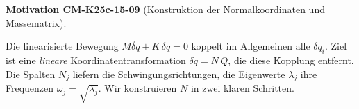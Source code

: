 \documentclass[10pt, letterpaper]{article}
\newcommand{\CustomHeading}[3]{%
  \par\medskip\noindent%
  \textbf{#1 #2} \textnormal{(#3)}.\enskip%
}
\newenvironment{MOT}[2]{\begin{unitbox}\CustomHeading{Motivation}{#1}{#2}}{\end{unitbox}}
\begin{document}

\begin{MOT}{CM-K25c-15-09}{Konstruktion der Normalkoordinaten und Massematrix}
Die linearisierte Bewegung
\(M\ddot{\delta q}+K\,\delta q=0\)
koppelt im Allgemeinen alle $\delta q_i$.
Ziel ist eine \emph{lineare} Koordinaten­transformation
\(\delta q=N\,Q\),
die diese Kopplung entfernt.  Die Spalten
\(N_j\) liefern die Schwingungsrichtungen,
die Eigenwerte \(\lambda_j\) ihre Frequenzen
\(\omega_j=\sqrt{\lambda_j}\).
Wir konstruieren $N$ in zwei klaren Schritten.
\end{MOT}

\end{document}
